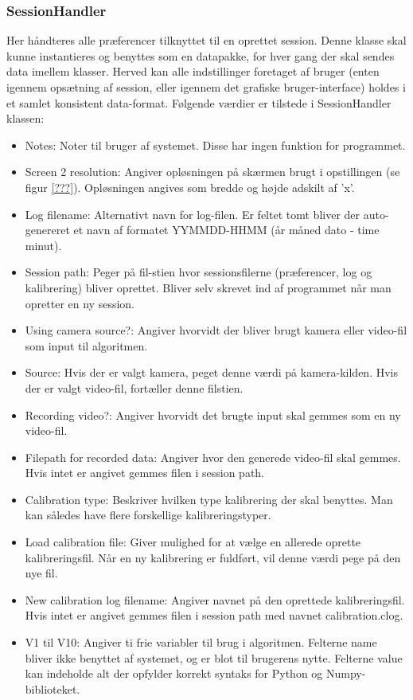 \documentclass[rapport.tex]{subfiles}
\begin{document}
		\subsubsection{SessionHandler}
		Her håndteres alle præferencer tilknyttet til en oprettet session. Denne klasse skal kunne instantieres og benyttes som en datapakke, for hver gang der skal sendes data imellem klasser. Herved kan alle indstillinger foretaget af bruger (enten igennem opsætning af session, eller igennem det grafiske bruger-interface) holdes i et samlet konsistent data-format.
		Følgende værdier er tilstede i SessionHandler klassen: 
		\begin{itemize}
			\item Notes: Noter til bruger af systemet. Disse har ingen funktion for programmet.
			\item Screen 2 resolution: Angiver opløsningen på skærmen brugt i opstillingen (se figur \ref{???}). Opløsningen angives som bredde og højde adskilt af 'x'.
			\item Log filename: Alternativt navn for log-filen. Er feltet tomt bliver der auto-genereret et navn af formatet YYMMDD-HHMM (år måned dato - time minut). 
			\item Session path: Peger på fil-stien hvor sessionsfilerne (præferencer, log og kalibrering) bliver oprettet. Bliver selv skrevet ind af programmet når  man opretter en ny session. 
			\item Using camera source?: Angiver hvorvidt der bliver brugt kamera eller video-fil som input til algoritmen. 
			\item Source: Hvis der er valgt kamera, peget denne værdi på kamera-kilden. Hvis der er valgt video-fil, fortæller denne filstien. 
			\item Recording video?: Angiver hvorvidt det brugte input skal gemmes som en ny video-fil. 
			\item Filepath for recorded data: Angiver hvor den generede video-fil skal gemmes. Hvis intet er angivet gemmes filen i session path. 
			\item Calibration type: Beskriver hvilken type kalibrering der skal benyttes. Man kan således have flere forskellige kalibreringstyper. 
			\item Load calibration file: Giver mulighed for at vælge en allerede oprette kalibreringsfil. Når en ny kalibrering er fuldført, vil denne værdi pege på den nye fil.
			\item New calibration log filename: Angiver navnet på den oprettede kalibreringsfil. Hvis intet er angivet gemmes filen i session path med navnet calibration.clog. 
			\item V1 til V10: Angiver ti frie variabler til brug i algoritmen. Felterne name bliver ikke benyttet af systemet, og er blot til brugerens nytte. Felterne value kan indeholde alt der opfylder korrekt syntaks for Python og Numpy-biblioteket. 
		\end{itemize}
		
\end{document}

